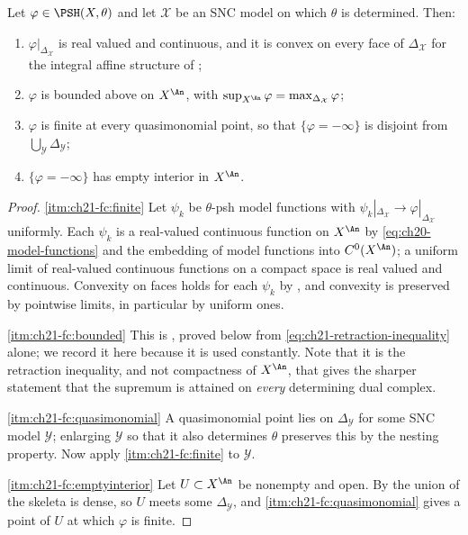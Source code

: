 \begin{proposition}
\label{prop:ch21-first-consequences}
Let \(\varphi\in\PSH(X,\theta)\) and let \(\mathcal X\) be an SNC model on
which \(\theta\) is determined.  Then:
\begin{enumerate}
\item\label{itm:ch21-fc:finite}
\(\varphi|_{\Delta_{\mathcal X}}\) is real valued and continuous, and it is
convex on every face of \(\Delta_{\mathcal X}\) for the integral affine
structure of ;
\item\label{itm:ch21-fc:bounded}
\(\varphi\) is bounded above on \(X^{\An}\), with
\(\sup_{X^{\An}}\varphi=\max_{\Delta_{\mathcal X}}\varphi\);
\item\label{itm:ch21-fc:quasimonomial}
\(\varphi\) is finite at every quasimonomial point, so that
\(\{\varphi=-\infty\}\) is disjoint from
\(\bigcup_{\mathcal Y}\Delta_{\mathcal Y}\);
\item\label{itm:ch21-fc:emptyinterior}
\(\{\varphi=-\infty\}\) has empty interior in \(X^{\An}\).
\end{enumerate}
\end{proposition}

\begin{proof}
\cref{itm:ch21-fc:finite}  Let \(\psi_k\) be \(\theta\)-psh model functions
with \(\psi_k|_{\Delta_{\mathcal X}}\to\varphi|_{\Delta_{\mathcal X}}\)
uniformly.  Each \(\psi_k\) is a real-valued continuous function on
\(X^{\An}\) by \eqref{eq:ch20-model-functions} and the embedding of model
functions into \(C^0(X^{\An})\); a uniform limit of real-valued continuous
functions on a compact space is real valued and continuous.  Convexity on
faces holds for each \(\psi_k\) by
, and convexity is preserved by
pointwise limits, in particular by uniform ones.

\cref{itm:ch21-fc:bounded}  This is , proved
below from \eqref{eq:ch21-retraction-inequality} alone; we record it here
because it is used constantly.  Note that it is the retraction inequality,
and not compactness of \(X^{\An}\), that gives the sharper statement that
the supremum is attained on \emph{every} determining dual complex.

\cref{itm:ch21-fc:quasimonomial}  A quasimonomial point lies on
\(\Delta_{\mathcal Y}\) for some SNC model \(\mathcal Y\); enlarging
\(\mathcal Y\) so that it also determines \(\theta\) preserves this by the
nesting property.  Now apply \cref{itm:ch21-fc:finite} to \(\mathcal Y\).

\cref{itm:ch21-fc:emptyinterior}  Let \(U\subset X^{\An}\) be nonempty and
open.  By  the union of the skeleta is
dense, so \(U\) meets some \(\Delta_{\mathcal Y}\), and
\cref{itm:ch21-fc:quasimonomial} gives a point of \(U\) at which \(\varphi\)
is finite.
\end{proof}

